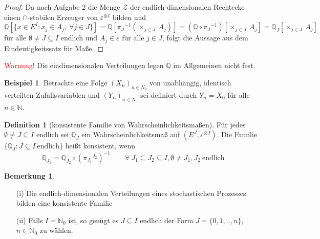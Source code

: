 \documentclass[a4paper,12pt]{scrartcl}
\theoremstyle{definition}
\newtheorem{bem}{Bemerkung}[section]
\newtheorem{bsp}{Beispiel}[section]
\newtheorem{defi}{Definition}[section]
\begin{document}
\begin{proof}
Da nach Aufgabe 2 die Menge $\mathcal{Z}$ der endlich-dimensionalen Rechtecke einen $\cap$-stabilen Erzeuger von $\varepsilon^{ \otimes I}$ bilden und
\begin{equation*}
\mathbb{Q}[\lbrace x \in E^{I} : x_{j} \in A_{j}, \: \forall j \in J\rbrace] = \mathbb{Q}[{\pi_{J}}^{-1}(\times_{j \in J} \: A_{j})] = (\mathbb{Q} \circ {\pi_{J}}^{-1})[\times_{j \in J} \: A_{j}] = \mathbb{Q}_{J}[\times_{j \in J} \: A_{j}]  
\end{equation*}
für alle $\emptyset \neq J \subseteq I$ endlich und $A_{j} \in \varepsilon$ für alle $j \in J$, folgt die Aussage aus dem Eindeutigkeitssatz für Maße. 
\end{proof}
\noindent
\textcolor{red}{Warnung!} Die eindimensionalen Verteilungen legen $\mathbb{Q}$ im Allgemeinen nicht fest.
\begin{bsp}
Betrachte eine Folge ${(X_{n})}_{n \in N_{0}}$ von unabhängig, identisch verteilten Zufallsvariablen und ${(Y_{n})}_{n \in N_{0}}$ sei definiert durch $Y_{n} = X_{0}$ für alle $n \in \mathbb{N}$.
\end{bsp}
\begin{defi}[konsistente Familie von Wahrscheinlichkeitsmaßen]
Für jedes $\emptyset \neq J \subseteq I$ endlich sei $\mathbb{Q}_{J}$ ein Wahrscheinlichkeitsmaß auf $(E^{J},\varepsilon^{ \otimes J})$. Die Familie $\lbrace \mathbb{Q}_{J} : J \subseteq I \: \mathrm{endlich}\rbrace$ heißt konsistent, wenn
\begin{equation*}
\mathbb{Q}_{J_{1}} = {\mathbb{Q}}_{J_{2}} \circ {({\pi_{J_{1}}}^{J_{2}})}^{-1} \qquad \forall \: J_{1} \subseteq J_{2} \subseteq I, \emptyset \neq J_{1},J_{2} \: \mathrm{endlich}
\end{equation*}
\end{defi}
\begin{bem}
\mbox{}
\begin{itemize}
\item[(i)] Die endlich-dimensionalen Verteilungen eines stochastischen Prozesses bilden eine konsistente Familie
\item[(ii)] Falls $I = \mathbb{N}_{0}$ ist, so genügt es $J \subseteq I $ endlich der Form $ J = \lbrace 0,1,..,n \rbrace$, $n \in \mathbb{N}_{0}$ zu wählen.
\end{itemize}
\end{bem}
\end{document}
